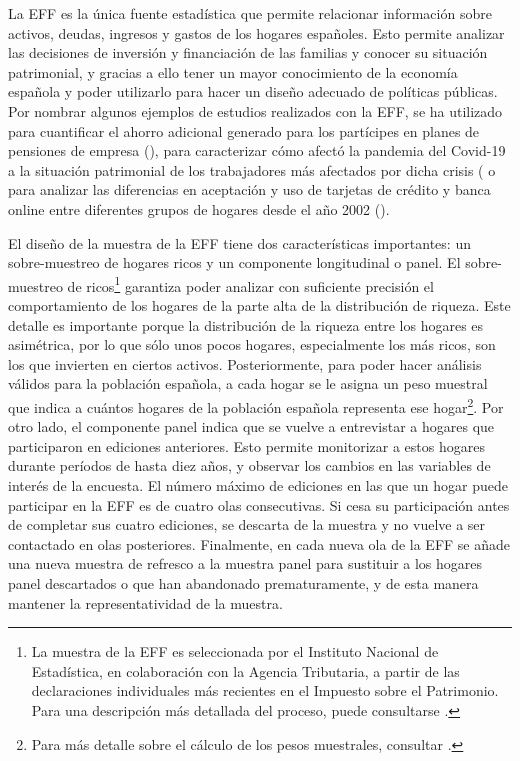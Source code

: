 La EFF es la única fuente estadística que permite relacionar información sobre activos, deudas, ingresos y gastos de los hogares españoles. Esto permite analizar las decisiones de inversión y financiación de las familias y conocer su situación patrimonial, y gracias a ello tener un mayor conocimiento de la economía española y poder utilizarlo para hacer un diseño adecuado de políticas públicas. Por nombrar algunos ejemplos de estudios realizados con la EFF, se ha utilizado para cuantificar el ahorro adicional generado para los partícipes en planes de pensiones de empresa (\cite{gomez2022pensiones}), para caracterizar cómo afectó la pandemia del Covid-19 a la situación patrimonial de los trabajadores más afectados por dicha crisis (\cite{alvargonzalez2020pandemia} o para analizar las diferencias en aceptación y uso de tarjetas de crédito y banca online entre diferentes grupos de hogares desde el año 2002 (\cite{crespo2023bancaonline}).

El diseño de la muestra de la EFF tiene dos características importantes: un sobre-muestreo de hogares ricos y un componente longitudinal o panel. El sobre-muestreo de ricos\footnote{La muestra de la EFF es seleccionada por el Instituto Nacional de Estadística, en colaboración con la Agencia Tributaria, a partir de las declaraciones individuales más recientes en el Impuesto sobre el Patrimonio. Para una descripción más detallada del proceso, puede consultarse \cite{effmethod2017}.} garantiza poder analizar con suficiente precisión el comportamiento de los hogares de la parte alta de la distribución de riqueza. Este detalle es importante porque la distribución de la riqueza entre los hogares es asimétrica, por lo que sólo unos pocos hogares, especialmente los más ricos, son los que invierten en ciertos activos. Posteriormente, para poder hacer análisis válidos para la población española, a cada hogar se le asigna un peso muestral que indica a cuántos hogares de la población española representa ese hogar\footnote{Para más detalle sobre el cálculo de los pesos muestrales, consultar \cite{effmethod2002}.}. Por otro lado, el componente panel indica que se vuelve a entrevistar a hogares que participaron en ediciones anteriores. Esto permite monitorizar a estos hogares durante períodos de hasta diez años, y observar los cambios en las variables de interés de la encuesta. El número máximo de ediciones en las que un hogar puede participar en la EFF es de cuatro olas consecutivas. Si cesa su participación antes de completar sus cuatro ediciones, se descarta de la muestra y no vuelve a ser contactado en olas posteriores. Finalmente, en cada nueva ola de la EFF se añade una nueva muestra de refresco a la muestra panel para sustituir a los hogares panel descartados o que han abandonado prematuramente, y de esta manera mantener la representatividad de la muestra.